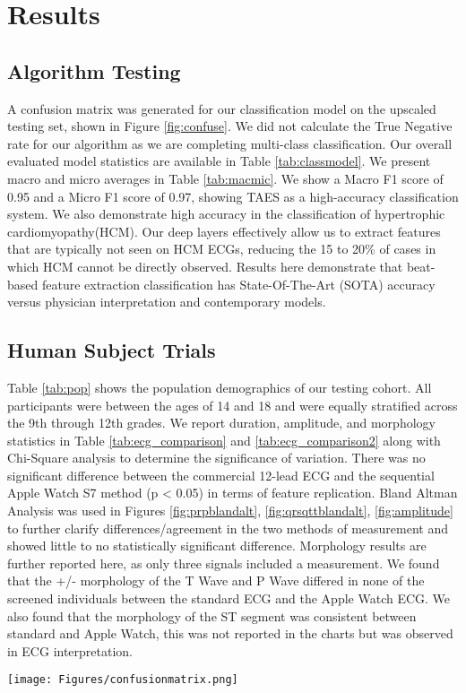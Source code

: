 \documentclass[
	a4paper, 
	10pt, 
	twoside, 
]{LTJournalArticle}
\begin{document}
\section{Results}
\subsection{Algorithm Testing}
A confusion matrix was generated for our classification model on the upscaled testing set, shown in Figure \ref{fig:confuse}. We did not calculate the True Negative rate for our algorithm as we are completing multi-class classification. Our overall evaluated model statistics are available in Table \ref{tab:classmodel}. We present macro and micro averages in Table \ref{tab:macmic}. We show a Macro F1 score of 0.95 and a Micro F1 score of 0.97, showing TAES as a high-accuracy classification system. We also demonstrate high accuracy in the classification of hypertrophic cardiomyopathy(HCM). Our deep layers effectively allow us to extract features that are typically not seen on HCM ECGs, reducing the 15 to 20\% of cases in which HCM cannot be directly observed. Results here demonstrate that beat-based feature extraction classification has State-Of-The-Art (SOTA) accuracy versus physician interpretation and contemporary models.  
\subsection{Human Subject Trials}
Table \ref{tab:pop} shows the population demographics of our testing cohort. All participants were between the ages of 14 and 18 and were equally stratified across the 9th through 12th grades. We report duration, amplitude, and morphology statistics in Table \ref{tab:ecg_comparison} and \ref{tab:ecg_comparison2} along with Chi-Square analysis to determine the significance of variation. There was no significant difference between the commercial 12-lead ECG and the sequential Apple Watch S7 method (p < 0.05) in terms of feature replication. Bland Altman Analysis was used in Figures \ref{fig:prpblandalt}, \ref{fig:qrsqttblandalt}, \ref{fig:amplitude} to further clarify differences/agreement in the two methods of measurement and showed little to no statistically significant difference. Morphology results are further reported here, as only three signals included a measurement. We found that the +/- morphology of the T Wave and P Wave differed in none of the screened individuals between the standard ECG and the Apple Watch ECG. We also found that the morphology of the ST segment was consistent between standard and Apple Watch, this was not reported in the charts but was observed in ECG interpretation. 
\begin{figure*} [!h]
    \centering
    \texttt{[image: Figures/confusionmatrix.png]}
    \caption{Confusion Matrix for Labeling. H = hypertrophic cardiomyopathy, A = arrhythmogenic left ventricular hypertrophy, N = normal sinus rhythm, M = myocarditis, L = long QT syndrome, D = dilated cardiomyopathy}
    \label{fig:confuse}
\end{figure*}
\end{document}
